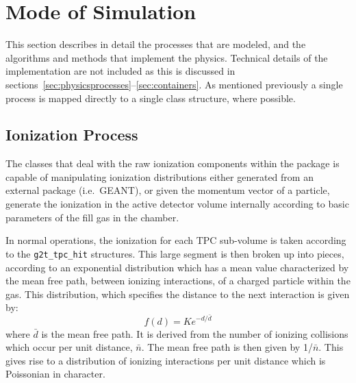 \documentclass[twoside]{article}
\begin{document}
\section{Mode of Simulation} 
\label{sec:simulationProcedure}

This section describes in detail the processes that are
modeled, and the algorithms and methods that implement
the physics.  Technical details of the implementation
are not included as this is discussed in 
sections~\ref{sec:physicsprocesses}--\ref{sec:containers}.
As mentioned previously a single process is
mapped directly to a single class structure, where possible.

\subsection{Ionization Process}

The classes that deal with the raw ionization components within
the package is capable of manipulating ionization distributions
either generated from an external package 
(i.e.~GEANT), or given the momentum vector of a particle, generate 
the ionization in the active detector volume internally according 
to basic parameters of the fill gas in the chamber.

In normal operations, the ionization for each TPC sub-volume 
is taken according to the \texttt{g2t\_tpc\_hit} structures.  
This large segment is then broken up into pieces, according 
to an exponential distribution which has a mean value characterized
by the mean free path, between ionizing interactions, of a charged
particle within the gas.  This distribution, which specifies the
distance to the next interaction is given by:
\begin{equation}
        f(d) = K e^{-d/\bar{d}}
\label{eq:meanFreePath}
\end{equation}
where $\bar{d}$ is the mean free path.  It is derived from
the number of ionizing collisions which occur per unit
distance, $\bar{n}$.  The mean free path is then given by 1/$\bar{n}$.  
This gives rise to a distribution of ionizing interactions per
unit distance which is Poissonian in character.
\end{document}
